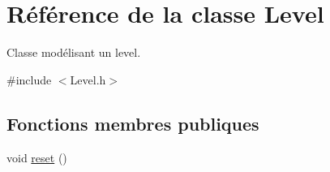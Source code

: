 \hypertarget{class_level}{\section{Référence de la classe Level}
\label{class_level}
}


Classe modélisant un level.  




{\ttfamily \#include $<$Level.\-h$>$}

\subsection*{Fonctions membres publiques}
\begin{DoxyCompactItemize}
\item 
\hypertarget{class_level_aca6522d3c16432468659428c2be31af2}{void \hyperlink{class_level_aca6522d3c16432468659428c2be31af2}{reset} ()}\label{class_level_aca6522d3c16432468659428c2be31af2}


\end{DoxyCompactItemize}
